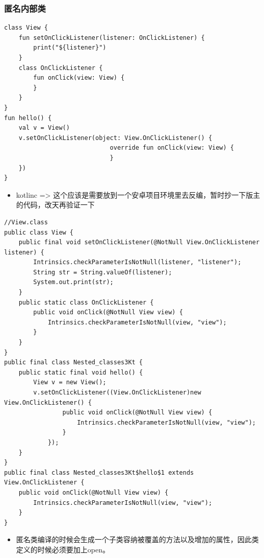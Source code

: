 \documentclass[9pt, b5paper]{article}
\begin{document}
\subsubsection{匿名内部类}
\label{sec-7-9-3}
\begin{verbatim}
class View {
    fun setOnClickListener(listener: OnClickListener) {
        print("${listener}")
    }
    class OnClickListener {
        fun onClick(view: View) {
        }
    }
}
fun hello() {
    val v = View()
    v.setOnClickListener(object: View.OnClickListener() {
                             override fun onClick(view: View) {
                             }
    })
}
\end{verbatim}
\begin{itemize}
\item kotlinc => 这个应该是需要放到一个安卓项目环境里去反编，暂时抄一下版主的代码，改天再验证一下
\end{itemize}
\begin{verbatim}
//View.class
public class View {
    public final void setOnClickListener(@NotNull View.OnClickListener listener) {
        Intrinsics.checkParameterIsNotNull(listener, "listener");
        String str = String.valueOf(listener);
        System.out.print(str);
    }
    public static class OnClickListener {
        public void onClick(@NotNull View view) {
            Intrinsics.checkParameterIsNotNull(view, "view");
        }
    }
}
public final class Nested_classes3Kt {
    public static final void hello() {
        View v = new View();
        v.setOnClickListener((View.OnClickListener)new View.OnClickListener() {
                public void onClick(@NotNull View view) {
                    Intrinsics.checkParameterIsNotNull(view, "view");
                }
            });
    }
}
public final class Nested_classes3Kt$hello$1 extends View.OnClickListener {
    public void onClick(@NotNull View view) {
        Intrinsics.checkParameterIsNotNull(view, "view");
    }
}
\end{verbatim}
\begin{itemize}
\item 匿名类编译的时候会生成一个子类容纳被覆盖的方法以及增加的属性，因此类定义的时候必须要加上open。
\end{itemize}
\end{document}
